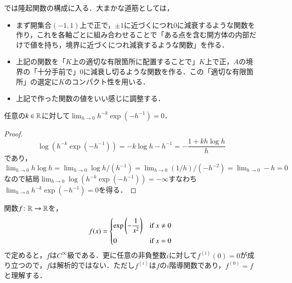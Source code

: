 では隆起関数の構成に入る．大まかな道筋としては，
\begin{itemize}
\item まず開集合$(-1,1)$上で正で，$\pm 1$に近づくにつれ0に減衰するような関数を作り，これを各軸ごとに組み合わせることで「ある点を含む開方体の内部だけで値を持ち，境界に近づくにつれ減衰するような関数」を作る．
\item 上記の関数を「$K$上の適切な有限箇所に配置することで」$K$上で正，$A$の境界の「十分手前で」0に減衰し切るような関数を作る．この「適切な有限箇所」の選定に$K$のコンパクト性を用いる．
\item 上記で作った関数の値をいい感じに調整する．
\end{itemize}

\begin{lem}\label{指数関数は多項式に優越する}
任意の$k \in \mathbb{R}$に対して$\lim_{h \to 0} h^{-k} \exp (-h^{-1}) =0$．
\end{lem}

\begin{proof}
\begin{equation}
\log \left(h^{-k} \exp (-h^{-1})\right) = -k \log h - h^{-1} = -\frac{1+kh \log h}{h}
\end{equation}であり，$\lim_{h \to 0} h \log h = \lim_{h \to 0} \log h /(h^{-1}) =  \lim_{h \to 0}  (1/h) /(-h^{-2}) = \lim_{h \to 0} - h = 0$なので結局$\lim_{h \to 0} \log \left(h^{-k} \exp (-h^{-1})\right) = - \infty$すなわち$\lim_{h \to 0} h^{-k} \exp (-h^{-1}) =0$を得る．
\end{proof}

\begin{prop}
関数$f \colon \mathbb{R} \to \mathbb{R}$を，
\begin{equation}
f(x) =   \begin{dcases*}
    \exp\left(-\frac{1}{x^2}\right) & if $x \neq 0$ \\
    0 & if $x=0$
  \end{dcases*}
\end{equation}
で定めると，$f$は$C^\infty$級である．更に任意の非負整数$i$に対して$f^{(i)}(0)=0$が成り立つので，$f$は解析的ではない．ただし$f^{(i)}$は$f$の$i$階導関数であり，$f^{(0)}=f$と理解する．
\end{prop}

